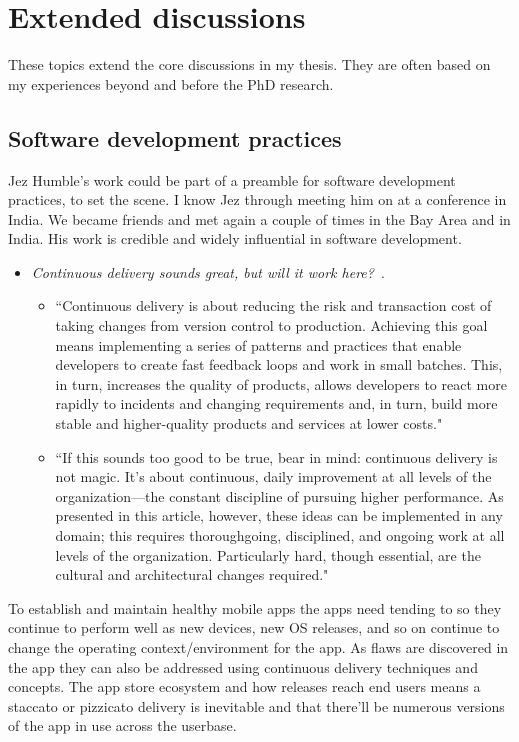 \chapter{Extended discussions}
These topics extend the core discussions in my thesis. They are often based on my experiences beyond and before the PhD research.


\section{Software development practices}
Jez Humble's work could be part of a preamble for software development practices, to set the scene. I know Jez through meeting him on at a conference in India. We became friends and met again a couple of times in the Bay Area and in India. His work is credible and widely influential in software development.

\begin{itemize}
    \item \emph{Continuous delivery sounds great, but will it work here?}~\citep{humble2018_continuous_delivery_sounds_great}. 
    \begin{itemize}
        \item ``Continuous delivery is about reducing the risk and transaction cost of taking changes from version control to production. Achieving this goal means implementing a series of patterns and practices that enable developers to create fast feedback loops and work in small batches. This, in turn, increases the quality of products, allows developers to react more rapidly to incidents and changing requirements and, in turn, build more stable and higher-quality products and services at lower costs."
        \item ``If this sounds too good to be true, bear in mind: continuous delivery is not magic. It's about continuous, daily improvement at all levels of the organization—the constant discipline of pursuing higher performance. As presented in this article, however, these ideas can be implemented in any domain; this requires thoroughgoing, disciplined, and ongoing work at all levels of the organization. Particularly hard, though essential, are the cultural and architectural changes required."
    \end{itemize}
    
\end{itemize}

To establish and maintain healthy mobile apps the apps need tending to so they continue to perform well as new devices, new OS releases, and so on continue to change the operating context/environment for the app. As flaws are discovered in the app they can also be addressed using continuous delivery techniques and concepts. The app store ecosystem and how releases reach end users means a staccato or pizzicato delivery is inevitable and that there'll be numerous versions of the app in use across the userbase. 
